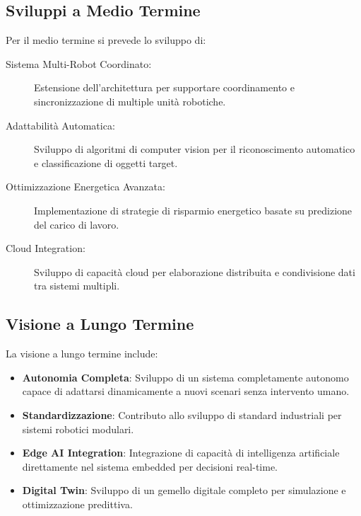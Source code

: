 \documentclass[12pt,a4paper,twoside,openright]{book}
\begin{document}
\subsection{Sviluppi a Medio Termine}

Per il medio termine si prevede lo sviluppo di:

\begin{description}
    \item[Sistema Multi-Robot Coordinato:] Estensione dell'architettura per supportare coordinamento e sincronizzazione di multiple unità robotiche.
    
    \item[Adattabilità Automatica:] Sviluppo di algoritmi di computer vision per il riconoscimento automatico e classificazione di oggetti target.
    
    \item[Ottimizzazione Energetica Avanzata:] Implementazione di strategie di risparmio energetico basate su predizione del carico di lavoro.
    
    \item[Cloud Integration:] Sviluppo di capacità cloud per elaborazione distribuita e condivisione dati tra sistemi multipli.
\end{description}

\subsection{Visione a Lungo Termine}

La visione a lungo termine include:

\begin{itemize}
    \item \textbf{Autonomia Completa}: Sviluppo di un sistema completamente autonomo capace di adattarsi dinamicamente a nuovi scenari senza intervento umano.
    
    \item \textbf{Standardizzazione}: Contributo allo sviluppo di standard industriali per sistemi robotici modulari.
    
    \item \textbf{Edge AI Integration}: Integrazione di capacità di intelligenza artificiale direttamente nel sistema embedded per decisioni real-time.
    
    \item \textbf{Digital Twin}: Sviluppo di un gemello digitale completo per simulazione e ottimizzazione predittiva.
\end{itemize}
\end{document}
